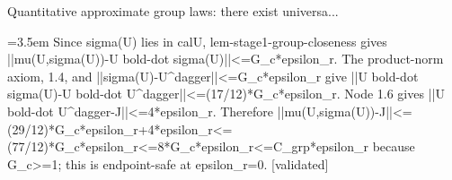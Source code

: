 \documentclass{article}
\newcommand{\step}[1]{\par\noindent\hangindent=3.5em\hangafter=1%
  \makebox[3.5em][l]{\textbf{#1.}}}
\newcommand{\steptag}[1]{\hfill{\small\textsf{[#1]}}}
\begin{document}
\begin{proofbox}{Quantitative approximate group laws: there exist universa...}
\step{1.8} Since sigma(U) lies in calU, lem-stage1-group-closeness gives ||mu(U,sigma(U))-U bold-dot sigma(U)||<=G\_c*epsilon\_r. The product-norm axiom, 1.4, and ||sigma(U)-U\textasciicircum{}dagger||<=G\_c*epsilon\_r give ||U bold-dot sigma(U)-U bold-dot U\textasciicircum{}dagger||<=(17/12)*G\_c*epsilon\_r. Node 1.6 gives ||U bold-dot U\textasciicircum{}dagger-J||<=4*epsilon\_r. Therefore ||mu(U,sigma(U))-J||<=(29/12)*G\_c*epsilon\_r+4*epsilon\_r<=(77/12)*G\_c*epsilon\_r<=8*G\_c*epsilon\_r<=C\_grp*epsilon\_r because G\_c>=1; this is endpoint-safe at epsilon\_r=0. \steptag{validated} \\[4pt]
\end{proofbox}
\end{document}
